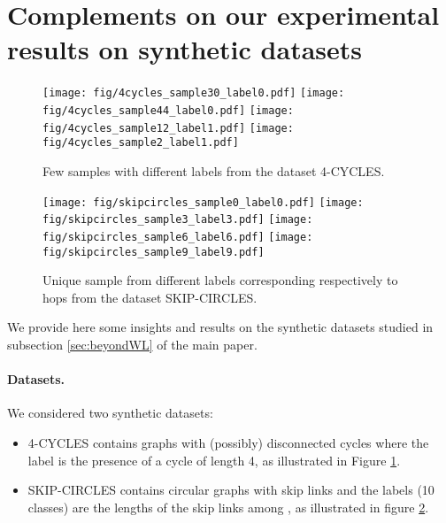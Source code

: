 \documentclass{article}
\begin{document}
{\section{Complements on our experimental results on synthetic datasets}
\begin{figure}[H] 
	\begin{center}
		\texttt{[image: fig/4cycles\_sample30\_label0.pdf]} \hfill
		\texttt{[image: fig/4cycles\_sample44\_label0.pdf]}\hfill
		\texttt{[image: fig/4cycles\_sample12\_label1.pdf]}\hfill
		\texttt{[image: fig/4cycles\_sample2\_label1.pdf]}
	\end{center}
	\caption{\label{fig:4cycles_samples}Few samples with different labels  from the dataset 4-CYCLES.}
\end{figure}
\begin{figure}[H] 
	\begin{center}
		\texttt{[image: fig/skipcircles\_sample0\_label0.pdf]} \hfill
		\texttt{[image: fig/skipcircles\_sample3\_label3.pdf]} \hfill
		\texttt{[image: fig/skipcircles\_sample6\_label6.pdf]} \hfill
		\texttt{[image: fig/skipcircles\_sample9\_label9.pdf]} \hfill
	\end{center}
	\caption{\label{fig:skipcircles_samples}Unique sample from different labels  corresponding respectively to  hops from the dataset SKIP-CIRCLES.}
\end{figure}
We provide here some insights and results on the synthetic datasets studied in subsection \ref{sec:beyondWL} of the main paper.
\paragraph{Datasets.} 
We considered two synthetic datasets:
\begin{itemize}
	\item 4-CYCLES \cite{loukas2019graph, papp2021dropgnn} contains graphs with (possibly) disconnected cycles where the label  is the presence of a cycle of length 4, as illustrated in Figure \ref{fig:4cycles_samples}.
\end{itemize}
\begin{itemize}
	\item 
	SKIP-CIRCLES \cite{chen2019equivalence} contains circular graphs with skip links and the labels (10 classes) are the lengths of the skip links among , as illustrated in figure \ref{fig:skipcircles_samples}.
\end{itemize}

}
\end{document}
